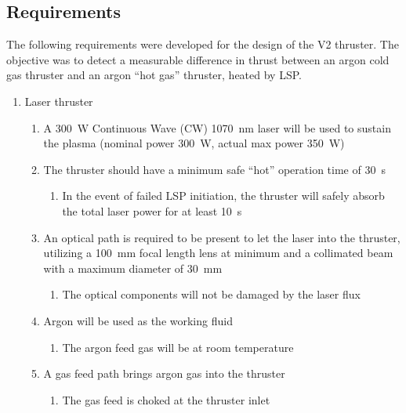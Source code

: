         \subsection{Requirements}

            The following requirements were developed for the design of the V2 thruster. The objective was to detect a measurable difference in thrust between an argon cold gas thruster and an argon “hot gas” thruster, heated by LSP.

            \begin{enumerate}
                \item Laser thruster
                \begin{enumerate}
                    \item A \qty{300}{W} Continuous Wave (CW) \qty{1070}{nm} laser will be used to sustain the plasma (nominal power \qty{300}{W}, actual max power \qty{350}{W})
                    \item The thruster should have a minimum safe “hot” operation time of \qty{30}{s}
                    \begin{enumerate}
                        \item In the event of failed LSP initiation, the thruster will safely absorb the total laser power for at least \qty{10}{s}
                    \end{enumerate}
                    \item An optical path is required to be present to let the laser into the thruster, utilizing a \qty{100}{mm} focal length lens at minimum and a collimated beam with a maximum diameter of \qty{30}{mm}
                    \begin{enumerate}
                        \item The optical components will not be damaged by the laser flux
                    \end{enumerate}
                    \item Argon will be used as the working fluid
                    \begin{enumerate}
                        \item The argon feed gas will be at room temperature
                    \end{enumerate}
                    \item A gas feed path brings argon gas into the thruster
                    \begin{enumerate}
                        \item The gas feed is choked at the thruster inlet

\end{enumerate}
\end{enumerate}
\end{enumerate}
